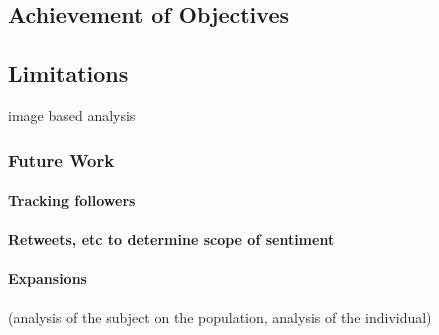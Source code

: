 \documentclass{acm_proc_article-sp}
\begin{document}
	\subsection{Achievement of Objectives}
	\subsection{Limitations}
	image based analysis
		\subsubsection{Future Work}
			\paragraph{Tracking followers}
			\paragraph{Retweets, etc to determine scope of sentiment}
			\paragraph{Expansions}
			(analysis of the subject on the population, analysis of the individual)


\end{document}
